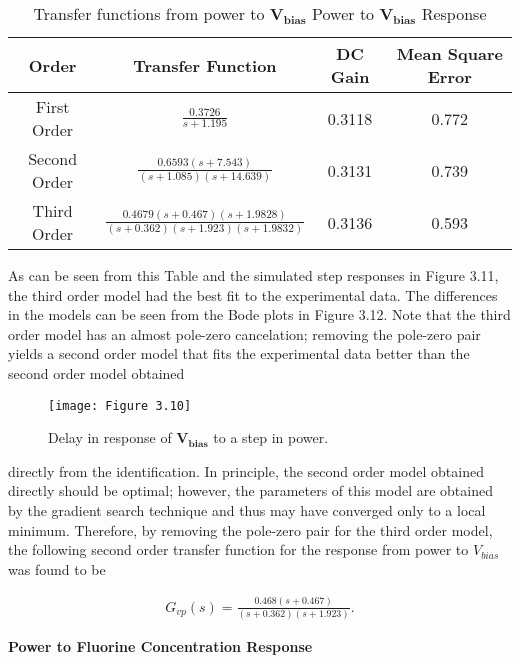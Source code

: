 \begin{table}[H]
	\centering
	\renewcommand{\arraystretch}{2}
	\begin{tabular}{|c|c|c|c|}
		\hline
		Order & Transfer Function & DC Gain & Mean Square Error \\
		\hline 
		First Order & \large{$\frac{0.3726}{s+1.195}$} & 0.3118 & 0.772 \\
		\hline
		Second Order & \large{$\frac{0.6593(s+7.543)}{(s+1.085)(s+14.639)}$} & 0.3131 & 0.739 \\
		\hline
		Third Order & \large{$\frac{0.4679(s+0.467)(s+1.9828)}{(s+0.362)(s+1.923)(s+1.9832)}$} & 0.3136 & 0.593 \\
		\hline
	\end{tabular}
	\renewcommand{\arraystretch}{1}
	\bf\caption{ Transfer functions from power to $\mathbf{V_{bias}}$ Power to $\mathbf{V_{bias}}$ Response}
	\label{Table:3.2}
\end{table}

As can be seen from this Table and the simulated step responses in Figure 3.11, the third order model had the best fit to the experimental data. The differences in the models can be seen from the Bode plots in Figure 3.12. Note that the third order model has an almost pole-zero cancelation; removing the pole-zero pair yields a second order model that fits the experimental data better than the second order model obtained 

\begin{figure}[H]
	\centering
	\texttt{[image: Figure 3.10]}
	\bf\caption{ Delay in response of $\mathbf{V_{bias}}$ to a step in power.}
	\label{fig:3.10}
\end{figure}

\noindent directly from the identification. In principle, the second order model obtained directly should be optimal; however, the parameters of this model are obtained by the gradient search technique and thus may have converged only to a local minimum. Therefore, by removing the pole-zero pair for the third order model, the following second order transfer function for the response from power to $V_{bias}$ was found to be


\begin{align}
	G_{vp}(s) = \frac{0.468(s+0.467)}{(s+0.362)(s+1.923)}.
\end{align}

\noindent\textbf{Power to Fluorine Concentration Response}

